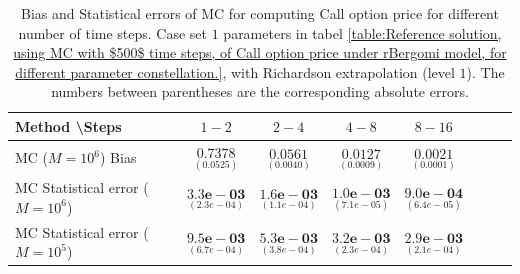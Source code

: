\documentclass[11pt]{article}
\begin{document}
\begin{table}[h!]
	\centering
	\begin{tabular}{l*{6}{c}r}
		Method \textbackslash  Steps            & $1-2$ & $2-4$ & $4-8$ & $8-16$  \\
		\hline
		MC ($M=10^6$)  Bias   &$\underset{( 0.0525)}{\mathbf{0.7378}}$  & $\underset{(    0.0040)}{\mathbf{0.0561}}$  & $\underset{(0.0009 )}{\mathbf{0.0127}}$  & $\underset{(0.0001)}{\mathbf{0.0021}}$ \\	
		
		MC Statistical error ($M=10^6$)   & $\underset{( 2.3e-04)}{\mathbf{3.3e-03}}$  & $\underset{(  1.1e-04)}{\mathbf{1.6e-03}}$  & $\underset{(7.1e-05)}{\mathbf{1.0e-03}}$ & $\underset{(   6.4e-05 )}{\mathbf{9.0e-04}}$ \\	
		
		
		MC Statistical error  ($M=10^5$)  & $\underset{( 6.7e-04)}{\mathbf{9.5e-03}}$  & $\underset{(  3.8e-04)}{\mathbf{5.3e-03}}$  & $\underset{(2.3e-04)}{\mathbf{3.2e-03}}$ & $\underset{(2.1e-04)}{\mathbf{2.9e-03}}$ \\
		\hline
	\end{tabular}
	\caption{Bias and Statistical errors of MC   for computing Call option price  for different number of time steps. Case set $1$ parameters in tabel \ref{table:Reference solution, using MC with $500$ time steps, of Call option price under rBergomi model, for different parameter constellation.}, with Richardson extrapolation (level $1$). The numbers between parentheses are the corresponding absolute errors.}
	\label{Bias and Statistical errors of MC ($M=10^6$)  for computing Call option price  for different number of time steps. Case set $1$ parameters, with Richardson extrapolation (level1). The numbers between parentheses are the corresponding absolute errors.}
\end{table}
\end{document}
